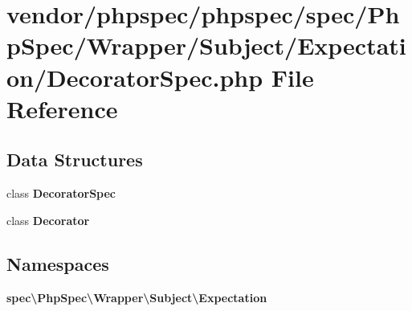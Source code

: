\section{vendor/phpspec/phpspec/spec/\+Php\+Spec/\+Wrapper/\+Subject/\+Expectation/\+Decorator\+Spec.php File Reference}
\label{_decorator_spec_8php}
\subsection*{Data Structures}
\begin{DoxyCompactItemize}
\item 
class {\bf Decorator\+Spec}
\item 
class {\bf Decorator}
\end{DoxyCompactItemize}
\subsection*{Namespaces}
\begin{DoxyCompactItemize}
\item 
 {\bf spec\textbackslash{}\+Php\+Spec\textbackslash{}\+Wrapper\textbackslash{}\+Subject\textbackslash{}\+Expectation}
\end{DoxyCompactItemize}

